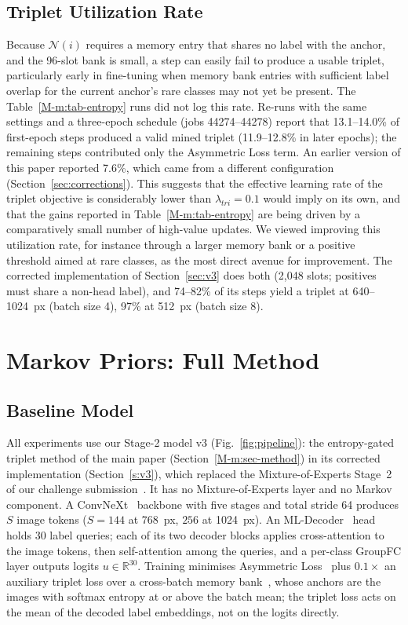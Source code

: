 \documentclass[conference]{IEEEtran}
\begin{document}
\subsection{Triplet Utilization Rate}
\label{sec:util}
Because $\mathcal{N}(i)$ requires a memory entry that shares no label with the anchor, and the 96-slot bank is small, a step can easily fail to produce a usable triplet, particularly early in fine-tuning when memory bank entries with sufficient label overlap for the current anchor's rare classes may not yet be present. The Table~\ref{M-m:tab-entropy} runs did not log this rate. Re-runs with the same settings and a three-epoch schedule (jobs 44274--44278) report that 13.1--14.0\% of first-epoch steps produced a valid mined triplet (11.9--12.8\% in later epochs); the remaining steps contributed only the Asymmetric Loss term. An earlier version of this paper reported 7.6\%, which came from a different configuration (Section~\ref{sec:corrections}). This suggests that the effective learning rate of the triplet objective is considerably lower than $\lambda_{tri}{=}0.1$ would imply on its own, and that the gains reported in Table~\ref{M-m:tab-entropy} are being driven by a comparatively small number of high-value updates. We viewed improving this utilization rate, for instance through a larger memory bank or a positive threshold aimed at rare classes, as the most direct avenue for improvement. The corrected implementation of Section~\ref{sec:v3} does both (2,048 slots; positives must share a non-head label), and 74--82\% of its steps yield a triplet at 640--1024~px (batch size 4), 97\% at 512~px (batch size 8).


\section{Markov Priors: Full Method}
\label{s:mkmethod}

\subsection{Baseline Model}
All experiments use our Stage-2 model v3 (Fig.~\ref{fig:pipeline}): the entropy-gated triplet method of the main paper (Section~\ref{M-m:sec-method}) in its corrected implementation (Section~\ref{s:v3}), which replaced the Mixture-of-Experts Stage~2 of our challenge submission~\cite{b12}. It has no Mixture-of-Experts layer and no Markov component. A ConvNeXt~\cite{b1} backbone with five stages and total stride 64 produces $S$ image tokens ($S{=}144$ at 768~px, $256$ at 1024~px). An ML-Decoder~\cite{b2} head holds 30 label queries; each of its two decoder blocks applies cross-attention to the image tokens, then self-attention among the queries, and a per-class GroupFC layer outputs logits $u \in \mathbb{R}^{30}$. Training minimises Asymmetric Loss~\cite{b3} plus $0.1\times$ an auxiliary triplet loss over a cross-batch memory bank~\cite{b6}, whose anchors are the images with softmax entropy at or above the batch mean; the triplet loss acts on the mean of the decoded label embeddings, not on the logits directly.
\end{document}
